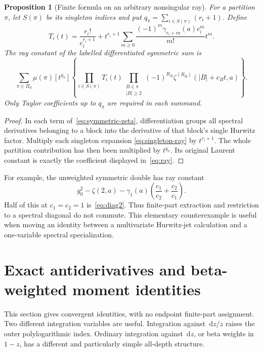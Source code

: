 \documentclass[11pt,oneside]{article}
\numberwithin{equation}{section}
\newtheorem{proposition}[theorem]{Proposition}
\theoremstyle{definition}
\theoremstyle{remark}
\newcommand{\dd}{\,\mathrm d}
\begin{document}
\begin{proposition}[Finite formula on an arbitrary nonsingular ray]
\label{prop:ray}
For a partition $\pi$, let $S(\pi)$ be its singleton indices and put
$q_\pi=\sum_{i\in S(\pi)}(r_i+1)$. Define
\[
T_i(t)=\frac{r_i!}{c_i^{r_i+1}}
 +t^{r_i+1}\sum_{m\ge0}
       \frac{(-1)^m\gamma_{r_i+m}(a)c_i^m}{m!}t^m.
\]
The ray constant of the labelled differentiated symmetric sum is
\begin{equation}\label{eq:ray}
\sum_{\pi\in\Pi_d}\mu(\pi)[t^{q_\pi}]
 \left\{\prod_{i\in S(\pi)}T_i(t)
 \prod_{\substack{B\in\pi\\|B|\ge2}}
       (-1)^{R_B}\zeta^{(R_B)}(|B|+c_Bt,a)\right\}.
\end{equation}
Only Taylor coefficients up to $q_\pi$ are required in each summand.
\end{proposition}

\begin{proof}
In each term of~\eqref{eq:symmetric-zeta}, differentiation groups all
spectral derivatives belonging to a block into the derivative of that block's
single Hurwitz factor. Multiply each singleton expansion
\eqref{eq:singleton-ray} by $t^{r_i+1}$. The whole partition contribution has
then been multiplied by $t^{q_\pi}$. Its original Laurent constant is exactly
the coefficient displayed in~\eqref{eq:ray}.
\end{proof}

For example, the unweighted symmetric double has ray constant
\begin{equation}\label{eq:ray2}
g_0^2-\zeta(2,a)-\gamma_1(a)
                \left(\frac{c_1}{c_2}+\frac{c_2}{c_1}\right).
\end{equation}
Half of this at $c_1=c_2=1$ is~\eqref{eq:diag2}. Thus finite-part extraction
and restriction to a spectral diagonal do not commute. This elementary
counterexample is useful when moving an identity between a multivariate
Hurwitz-jet calculation and a one-variable spectral specialization.

\section{Exact antiderivatives and beta-weighted moment identities}
\label{sec:primitives}

This section gives convergent identities, with no endpoint finite-part
assignment. Two different integration variables are useful. Integration
against $\dd z/z$ raises the outer polylogarithmic index. Ordinary integration
against $\dd z$, or beta weights in $1-z$, has a different and particularly
simple all-depth structure.
\end{document}
